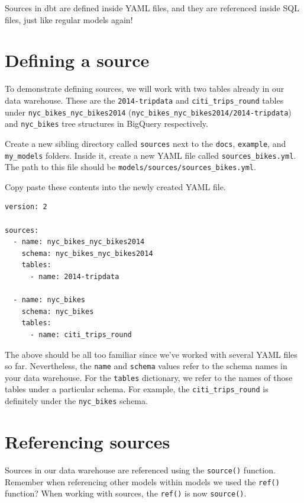 \documentclass[
]{book}
\begin{document}
Sources in dbt are defined inside YAML files, and they are referenced inside SQL files, just like regular models again!

\hypertarget{defining-a-source}{%
\section{Defining a source}\label{defining-a-source}}

To demonstrate defining sources, we will work with two tables already in our data warehouse. These are the \texttt{2014-tripdata} and \texttt{citi\_trips\_round} tables under \texttt{nyc\_bikes\_nyc\_bikes2014} (\texttt{nyc\_bikes\_nyc\_bikes2014/2014-tripdata}) and \texttt{nyc\_bikes} tree structures in BigQuery respectively.

Create a new sibling directory called \texttt{sources} next to the \texttt{docs}, \texttt{example}, and \texttt{my\_models} folders. Inside it, create a new YAML file called \texttt{sources\_bikes.yml}. The path to this file should be \texttt{models/sources/sources\_bikes.yml}.

Copy paste these contents into the newly created YAML file.

\begin{verbatim}
version: 2

sources:
  - name: nyc_bikes_nyc_bikes2014
    schema: nyc_bikes_nyc_bikes2014
    tables:
      - name: 2014-tripdata

  - name: nyc_bikes
    schema: nyc_bikes 
    tables:
      - name: citi_trips_round
\end{verbatim}

The above should be all too familiar since we've worked with several YAML files so far. Nevertheless, the \texttt{name} and \texttt{schema} values refer to the schema names in your data warehouse. For the \texttt{tables} dictionary, we refer to the names of those tables under a particular schema. For example, the \texttt{citi\_trips\_round} is definitely under the \texttt{nyc\_bikes} schema.

\hypertarget{referencing-sources}{%
\section{Referencing sources}\label{referencing-sources}}

Sources in our data warehouse are referenced using the \texttt{source()} function. Remember when referencing other models within models we used the \texttt{ref()} function? When working with sources, the \texttt{ref()} is now \texttt{source()}.
\end{document}
